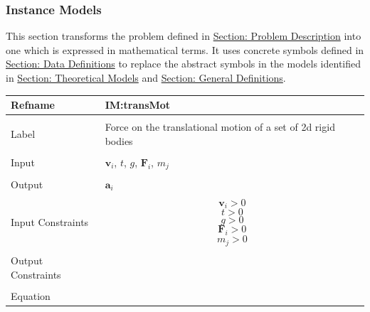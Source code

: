 \documentclass[12pt]{article}
\begin{document}
\subsubsection{Instance Models}
\label{Sec:IMs}
This section transforms the problem defined in \hyperref[Sec:ProbDesc]{Section: Problem Description} into one which is expressed in mathematical terms. It uses concrete symbols defined in \hyperref[Sec:DDs]{Section: Data Definitions} to replace the abstract symbols in the models identified in \hyperref[Sec:TMs]{Section: Theoretical Models} and \hyperref[Sec:GDs]{Section: General Definitions}.
~\newline
\noindent \begin{minipage}{\textwidth}
\begin{tabular}{p{} p{}}
\toprule \textbf{Refname} & \textbf{IM:transMot}
\label{IM:transMot}
\\ \midrule \\
Label & Force on the translational motion of a set of 2d rigid bodies
\\ \midrule \\
Input & ${\mathbf{v}_{i}}$, $t$, $g$, ${\mathbf{F}_{i}}$, ${m_{j}}$
\\ \midrule \\
Output & ${\mathbf{a}_{i}}$
\\ \midrule \\
Input Constraints & \begin{dmath}
                    {\mathbf{v}_{i}}>0
                    \end{dmath}
                    \begin{dmath}
                    t>0
                    \end{dmath}
                    \begin{dmath}
                    g>0
                    \end{dmath}
                    \begin{dmath}
                    {\mathbf{F}_{i}}>0
                    \end{dmath}
                    \begin{dmath}
                    {m_{j}}>0
                    \end{dmath}
\\ \midrule \\
Output Constraints & 
\\ \midrule \\
Equation & \begin{dmath}

\end{dmath}
\end{tabular}
\end{minipage}
\end{document}
